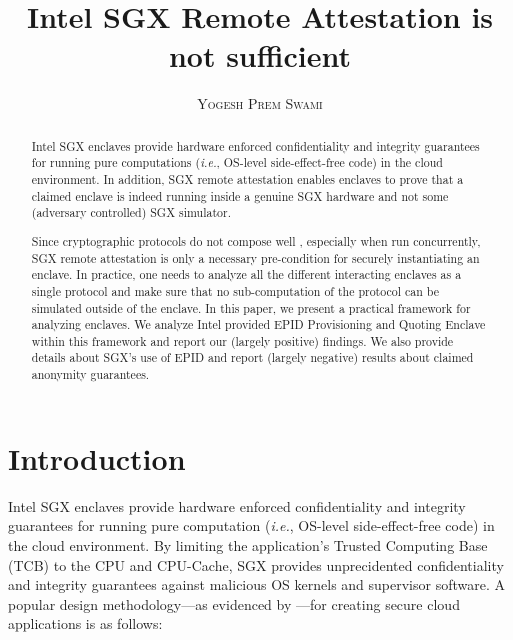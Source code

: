 \documentclass[10pt]{article}
\title{\bf Intel SGX Remote Attestation is not sufficient}
\author{\textsc{Yogesh Prem Swami}}
\date{\lastupdate}
\newcommand{\ie}{\textit{i.e.}}
\begin{document}

\maketitle

\begin{abstract}
  Intel SGX enclaves provide hardware enforced confidentiality and
  integrity guarantees for running pure computations (\ie, OS-level
  side-effect-free code) in the cloud environment. In addition, SGX
  remote attestation enables enclaves to prove that a claimed enclave
  is indeed running inside a genuine SGX hardware and not some
  (adversary controlled) SGX simulator.

  Since cryptographic protocols do not compose well
  \cite{cramerthesis,ucframework,gnuc}, especially when run concurrently, SGX remote
  attestation is only a necessary pre-condition for securely
  instantiating an enclave. In practice, one needs to analyze all the
  different interacting enclaves as a single protocol and make sure
  that no sub-computation of the protocol can be simulated outside of
  the enclave. In this paper, we present a practical framework for
  analyzing enclaves. We analyze Intel provided EPID\cite{epid}
  \textsf{Provisioning} and \textsf{Quoting} Enclave\cite{sgxattest}
  within this framework and report our (largely positive) findings. We
  also provide details about SGX's use of EPID and report (largely
  negative) results about claimed anonymity guarantees.

\end{abstract}

\section{Introduction}
\label{sec:intro}
  Intel SGX enclaves\cite{sgxinnov, sgxinnov2} provide hardware
  enforced confidentiality and integrity guarantees for running pure
  computation (\textit{i.e.}, OS-level side-effect-free code) in the
  cloud environment. By limiting the application's Trusted Computing
  Base (TCB) to the CPU and CPU-Cache, SGX provides unprecidented
  confidentiality and integrity guarantees against malicious OS
  kernels and supervisor software. A popular design methodology---as
  evidenced by \cite{Haven, Graphene, Scone}---for creating secure
  cloud applications is as follows:
\end{document}
